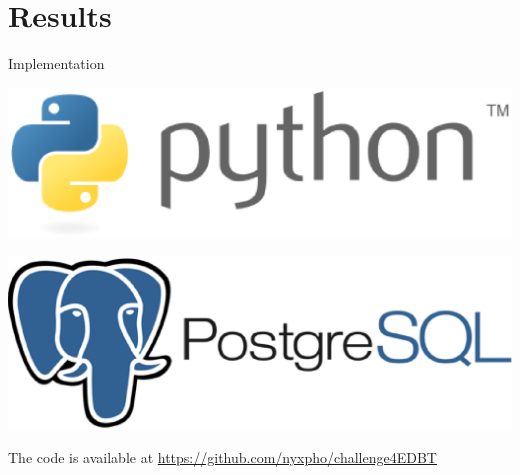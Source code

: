 \documentclass[xcolor=dvipsnames]{beamer}
\begin{document}
\section{Results}
\begin{frame}{Implementation}

\includegraphics[scale=0.3]{media/python-logo.eps}

\bigskip


\includegraphics[scale=0.2]{media/postgres-logo.eps}

\bigskip

The code is available at \url{https://github.com/nyxpho/challenge4EDBT}

\end{frame}
\end{document}
